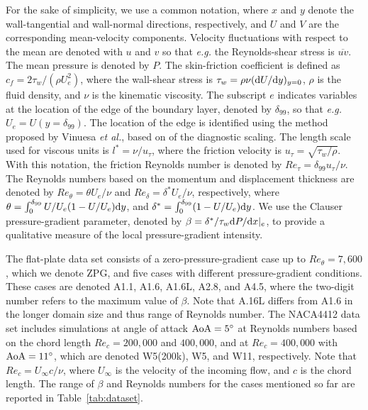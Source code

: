 For the sake of simplicity, we use a common notation, where $x$ and $y$ denote the wall-tangential and wall-normal directions, respectively, and $U$ and $V$ are the corresponding mean-velocity components. Velocity fluctuations with respect to the mean are denoted with $u$ and $v$ so that \textit{e.g.} the Reynolds-shear stress is $\overline{uv}$. The mean pressure is denoted by $P$. The skin-friction coefficient is defined as $c_f=2\tau_w/(\rho U_e^2)$, where the wall-shear stress is $\tau_w= \rho \nu ( {\rm d} U / {\rm d} y)_{y=0}$, $\rho$ is the fluid density, and $\nu$ is the kinematic viscosity. The subscript $e$ indicates variables at the location of the edge of the boundary layer, denoted by $\delta_{99}$, so that \textit{e.g.} $U_e=U(y=\delta_{99})$. The location of the edge is identified using the method proposed by Vinuesa \textit{et al.}\cite{vinu16}, based on of the diagnostic scaling\cite{alfr11,droz15}. The length scale used for viscous units is $l^*=\nu/u_\tau$, where the friction velocity is $u_\tau=\sqrt{\tau_w / \rho}$. With this notation, the friction Reynolds number is denoted by $Re_\tau=\delta_{99} u_\tau / \nu$. The Reynolds numbers based on the momentum and displacement thickness are denoted by $Re_\theta=\theta U_e / \nu$ and $Re_\delta=\delta^* U_e / \nu$, respectively, where $\theta=\int_0^{\delta_{99}} U/U_e (1 - U/U_e) {\rm d}y$, and $\delta^*=\int_0^{\delta_{99}} (1 - U/U_e) {\rm d}y$. We use the Clauser pressure-gradient parameter\cite{clau56}, denoted by $\beta=\delta^* / \tau_w {\rm d} P / {\rm d} x |_e$, to provide a qualitative measure of the local pressure-gradient intensity. 


The flat-plate data set consists of a zero-pressure-gradient case up to $Re_\theta=7,600$, which we denote ZPG, and five cases with different pressure-gradient conditions. These cases are denoted A1.1, A1.6, A1.6L, A2.8, and A4.5, where the two-digit number refers to the maximum value of $\beta$. Note that A.16L differs from A1.6 in the longer domain size and thus range of Reynolds number. The NACA4412 data set includes simulations at angle of attack ${\rm AoA}=5^\circ$ at Reynolds numbers based on the chord length $Re_c=200,000$ and $400,000$, and at $Re_c=400,000$ with ${\rm AoA}=11^\circ$, which are denoted W5(200k), W5, and W11, respectively. Note that $Re_c=U_\infty c /\nu$, where $U_\infty$ is the velocity of the incoming flow, and $c$ is the chord length. The range of $\beta$ and Reynolds numbers for the cases mentioned so far are reported in Table~\ref{tab:dataset}. 

